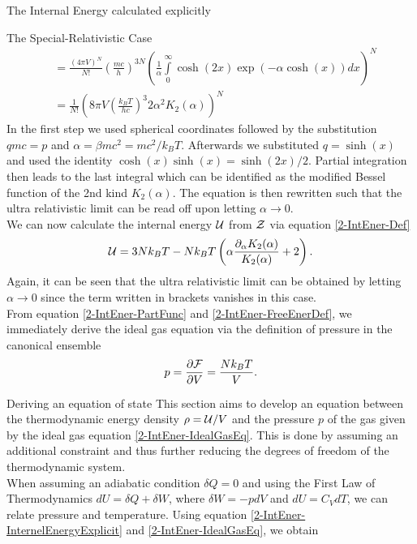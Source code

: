 \begin{section}{The Internal Energy calculated explicitly}
\begin{subsection}{The Special-Relativistic Case}
\begin{align}
		&= \frac{(4\pi V)^N}{N!}\left(\frac{mc}{h}\right)^{3N}\left(\frac{1}{\alpha}\int\limits_0^\infty\cosh(2x)\exp(-\alpha\cosh(x))dx  \right)^N\\
		&= \frac{1}{N!}\left(8\pi V\left(\frac{k_BT}{hc}\right)^{3}2\alpha^2K_2(\alpha)\right)^N
		\label{2-IntEner-PartFunc}
\end{align}
In the first step we used spherical coordinates followed by the substitution $qmc=p$ and $\alpha=\beta mc^2=mc^2/k_BT$. Afterwards we substituted $q=\sinh(x)$ and used the identity $\cosh(x)\sinh(x)=\sinh(2x)/2$. Partial integration then leads to the last integral which can be identified as the modified Bessel function of the 2nd kind $K_2(\alpha)$. The equation is then rewritten such that the ultra relativistic limit can be read off upon letting $\alpha\rightarrow0$.\\
We can now calculate the internal energy $\mathcal{U}$ from $\mathcal{Z}$ via equation \eqref{2-IntEner-Def}
\begin{equation}
    \mathcal{U} = 3Nk_BT - Nk_BT\left(\alpha\frac{\partial_\alpha K_2(\alpha)}{K_2(\alpha)}+2\right).
    \label{2-IntEner-InternelEnergyExplicit}
\end{equation}
Again, it can be seen that the ultra relativistic limit can be obtained by letting $\alpha\rightarrow0$ since the term written in brackets vanishes in this case.\\
From equation \eqref{2-IntEner-PartFunc} and \eqref{2-IntEner-FreeEnerDef}, we immediately derive the ideal gas equation via the definition of pressure in the canonical ensemble
\begin{equation}
    p=\frac{\partial\mathcal{F}}{\partial V} = \frac{Nk_ BT}{V}.
    \label{2-IntEner-IdealGasEq}
\end{equation}
\end{subsection}
%
%
%
\begin{subsection}{Deriving an equation of state}
This section aims to develop an equation between the thermodynamic energy density $\rho=\mathcal{U}/V$ and the pressure $p$ of the gas given by the ideal gas equation \eqref{2-IntEner-IdealGasEq}. This is done by assuming an additional constraint and thus further reducing the degrees of freedom of the thermodynamic system.\\
When assuming an adiabatic condition $\delta Q=0$ and using the First Law of Thermodynamics $dU = \delta Q + \delta W$, where $\delta W=-pdV$ and $dU=C_VdT$, we can relate pressure and temperature. Using equation \ref{2-IntEner-InternelEnergyExplicit} and \ref{2-IntEner-IdealGasEq}, we obtain

\end{subsection}
\end{section}
